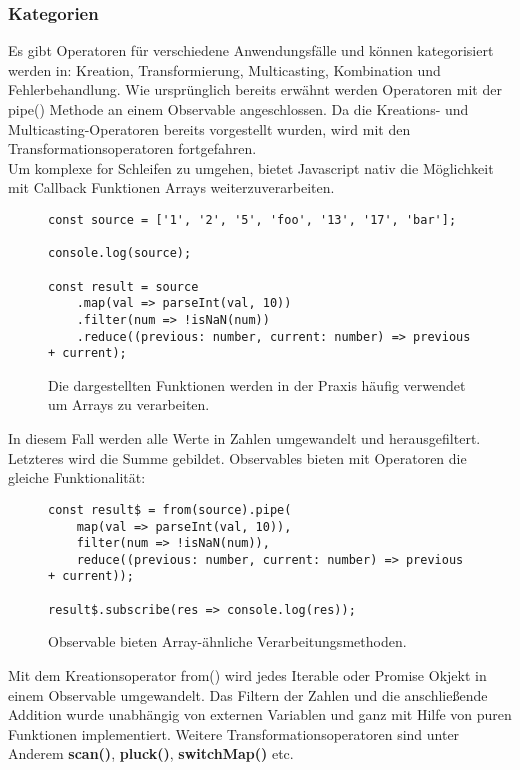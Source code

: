 \subsubsection{Kategorien}

Es gibt Operatoren für verschiedene Anwendungsfälle und können kategorisiert werden in: Kreation, Transformierung, Multicasting, Kombination und Fehlerbehandlung. Wie ursprünglich bereits erwähnt werden Operatoren mit der pipe() Methode an einem Observable angeschlossen. Da die Kreations- und Multicasting-Operatoren bereits vorgestellt wurden, wird mit den Transformationsoperatoren fortgefahren.\\

\noindent
Um komplexe for Schleifen zu umgehen, bietet Javascript nativ die Möglichkeit mit Callback Funktionen Arrays weiterzuverarbeiten.

\begin{figure}[H]
\begin{lstlisting}[basicstyle=\small]
const source = ['1', '2', '5', 'foo', '13', '17', 'bar'];

console.log(source);

const result = source
    .map(val => parseInt(val, 10))
    .filter(num => !isNaN(num))
    .reduce((previous: number, current: number) => previous + current);
\end{lstlisting}
\caption{Die dargestellten Funktionen werden in der Praxis häufig verwendet um Arrays zu verarbeiten.}
\end{figure}

\noindent
In diesem Fall werden alle Werte in Zahlen umgewandelt und herausgefiltert. Letzteres wird die Summe gebildet. Observables bieten mit Operatoren die gleiche Funktionalität:

\begin{figure}[H]
\begin{lstlisting}[basicstyle=\small]
const result$ = from(source).pipe(
    map(val => parseInt(val, 10)),
    filter(num => !isNaN(num)),
    reduce((previous: number, current: number) => previous + current));

result$.subscribe(res => console.log(res));
\end{lstlisting}
\caption{Observable bieten Array-ähnliche Verarbeitungsmethoden.}
\end{figure}

\noindent
Mit dem Kreationsoperator from() wird jedes Iterable oder Promise Okjekt in einem Observable umgewandelt. Das Filtern der Zahlen und die anschließende Addition wurde unabhängig von externen Variablen und ganz mit Hilfe von puren Funktionen implementiert. Weitere Transformationsoperatoren sind unter Anderem \textbf{scan()}, \textbf{pluck()}, \textbf{switchMap()} etc.\\

